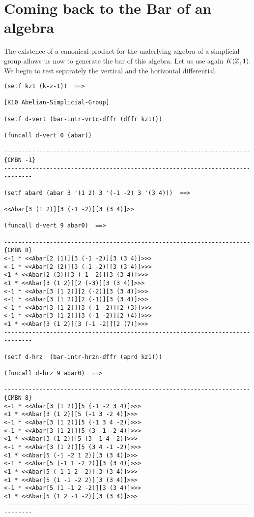 \section {Coming back to the Bar of an algebra}

The existence of a canonical product for the underlying algebra of a simplicial group
allows us now to generate the bar of this algebra. Let us use again $K({\mathbb{Z}}, 1).$
We begin to test separately the vertical and the horizontal differential.
{\footnotesize\begin{verbatim}
(setf kz1 (k-z-1))  ==>

[K10 Abelian-Simplicial-Group]

(setf d-vert (bar-intr-vrtc-dffr (dffr kz1)))

(funcall d-vert 0 (abar))

----------------------------------------------------------------------{CMBN -1}
------------------------------------------------------------------------------

(setf abar0 (abar 3 '(1 2) 3 '(-1 -2) 3 '(3 4)))  ==>

<<Abar[3 (1 2)][3 (-1 -2)][3 (3 4)]>>

(funcall d-vert 9 abar0)  ==>

----------------------------------------------------------------------{CMBN 8}
<-1 * <<Abar[2 (1)][3 (-1 -2)][3 (3 4)]>>>
<-1 * <<Abar[2 (2)][3 (-1 -2)][3 (3 4)]>>>
<1 * <<Abar[2 (3)][3 (-1 -2)][3 (3 4)]>>>
<1 * <<Abar[3 (1 2)][2 (-3)][3 (3 4)]>>>
<-1 * <<Abar[3 (1 2)][2 (-2)][3 (3 4)]>>>
<-1 * <<Abar[3 (1 2)][2 (-1)][3 (3 4)]>>>
<-1 * <<Abar[3 (1 2)][3 (-1 -2)][2 (3)]>>>
<-1 * <<Abar[3 (1 2)][3 (-1 -2)][2 (4)]>>>
<1 * <<Abar[3 (1 2)][3 (-1 -2)][2 (7)]>>>
------------------------------------------------------------------------------

(setf d-hrz  (bar-intr-hrzn-dffr (aprd kz1)))

(funcall d-hrz 9 abar0)  ==>

----------------------------------------------------------------------{CMBN 8}
<-1 * <<Abar[3 (1 2)][5 (-1 -2 3 4)]>>>
<1 * <<Abar[3 (1 2)][5 (-1 3 -2 4)]>>>
<-1 * <<Abar[3 (1 2)][5 (-1 3 4 -2)]>>>
<-1 * <<Abar[3 (1 2)][5 (3 -1 -2 4)]>>>
<1 * <<Abar[3 (1 2)][5 (3 -1 4 -2)]>>>
<-1 * <<Abar[3 (1 2)][5 (3 4 -1 -2)]>>>
<1 * <<Abar[5 (-1 -2 1 2)][3 (3 4)]>>>
<-1 * <<Abar[5 (-1 1 -2 2)][3 (3 4)]>>>
<1 * <<Abar[5 (-1 1 2 -2)][3 (3 4)]>>>
<1 * <<Abar[5 (1 -1 -2 2)][3 (3 4)]>>>
<-1 * <<Abar[5 (1 -1 2 -2)][3 (3 4)]>>>
<1 * <<Abar[5 (1 2 -1 -2)][3 (3 4)]>>>
------------------------------------------------------------------------------
\end{verbatim}}

